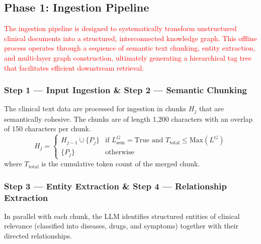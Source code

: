 \documentclass[a4paper,fleqn]{cas-sc}
\begin{document}
\subsection{Phase 1: Ingestion Pipeline}
\textcolor{red}{The ingestion pipeline is designed to systematically transform unstructured clinical documents into a structured, interconnected knowledge graph. This offline process operates through a sequence of semantic text chunking, entity extraction, and multi-layer graph construction, ultimately generating a hierarchical tag tree that facilitates efficient downstream retrieval.}
\subsubsection{Step 1 --- Input Ingestion \& Step 2 --- Semantic Chunking}
The clinical text data are processed for ingestion in chunks $H_j$ that are semantically cohesive. The chunks are of length 1,200 characters with an overlap of 150 characters per chunk.
\begin{equation}
H_j = \begin{cases}
H_{j-1} \cup \{P_j\} & \text{if } L^G_\text{sem}=\text{True} \text{ and } T_{\text{total}} \le \text{Max}(L^G) \\
\{P_j\} & \text{otherwise}
\end{cases}
\end{equation}
where $T_{\text{total}}$ is the cumulative token count of the merged chunk.

\subsubsection{Step 3 --- Entity Extraction \& Step 4 --- Relationship Extraction}
In parallel with each chunk, the LLM identifies structured entities of clinical relevance (classified into diseases, drugs, and symptoms) together with their directed relationships.
\end{document}
